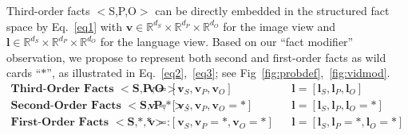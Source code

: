 \documentclass[runningheads]{llncs}
\begin{document}
Third-order facts $<$S,P,O$>$ can be directly embedded in the structured fact space by Eq.~\ref{eq1} with $\mathbf{v} \in  \mathbb{R}^{d_S} \times \mathbb{R}^{d_P} \times \mathbb{R}^{d_O}$ for the image view and $\mathbf{l}  \in  \mathbb{R}^{d_S} \times \mathbb{R}^{d_P} \times \mathbb{R}^{d_O}$ for the language view. %
Based on our ``fact modifier'' observation, we propose to represent both
second and first-order
facts as wild cards ``$*$'', as illustrated in Eq.~\ref{eq2},~\ref{eq3}; see Fig~\ref{fig:probdef},~\ref{fig:vidmod}.
\begin{align}
\textbf{Third-Order Facts $<$S,P,O$>$:}\;\; &
\mathbf{v} = [\mathbf{v}_S, \mathbf{v}_P,   \mathbf{v}_O ] &&
\mathbf{l}  = [\mathbf{l}_S, \mathbf{l}_P, \mathbf{l}_O] \label{eq1} \\
\textbf{Second-Order Facts $<$S, P,*$>$:}\;\; &
\mathbf{v}  = [\mathbf{v}_S, \mathbf{v}_P ,  \mathbf{v}_O = *] &&
\mathbf{l} = [\mathbf{l}_S , \mathbf{l}_P ,  \mathbf{l}_O = *] \label{eq2} \\
\textbf{First-Order Facts $<$S,*,*$>$:}\;\; &
\mathbf{v} = [\mathbf{v}_S, \mathbf{v}_P = *,  \mathbf{v}_O = *]  &&
\mathbf{l} = [\mathbf{l}_S , \mathbf{l}_P = *,  \mathbf{l}_O = *] \label{eq3}
\end{align}
\end{document}
